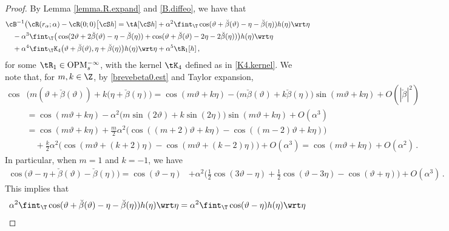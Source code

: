 \documentclass[a4paper,reqno,10pt]{article}
\newcommand{\OpM}{{\rm O}{\rm P}{\rm M}}
\begin{document}
\begin{proof}
	By Lemma \ref{lemma.R.expand} and \eqref{B.diffeo}, we have that
	\begin{align}
		&	\cB^{-1}	\big(\cR(r_\alpha;\alpha)- \cR(0;0)\big [\cS h]  = 	\tA[\cS h]+ \alpha^2\fint_{\T}\cos(\vartheta+\breve{\beta}(\vartheta)-\eta-\breve{\beta}(\eta)) h(\eta) \wrt \eta  \\
		&\quad  - \alpha^3 \fint_{\T}\big( \cos(2\vartheta+2\breve{\beta}(\vartheta)-\eta-\breve{\beta}(\eta)) + \cos(\vartheta+\breve{\beta}(\vartheta)-2\eta-2\breve{\beta}(\eta)) \big)h(\eta) \wrt \eta    \\
		& \quad+\alpha^4\fint_{\T} \mathtt{K}_4\big(\vartheta+\breve{\beta}(\vartheta), \eta+\breve{\beta}(\eta) \big)h(\eta) \wrt\eta+\alpha^5 \tR_{1}[h]\,,
	\end{align}  
	for some $\tR_{1}\in\OpM_{s}^{-\infty}$, with the kernel $\tK_{4}$ defined as in \eqref{K4.kernel}.
	We note that, for $m,k\in\Z$, by \eqref{brevebeta0.est} and Taylor expansion,
	\begin{align}
		\cos &\big(m(\vartheta+\breve{\beta}(\vartheta)) +k(\eta+\breve{\beta}(\eta) \big)   = \cos(m\vartheta+k\eta) -\big(m \breve{\beta}(\vartheta) + k\breve{\beta}(\eta)\big) \sin(m\vartheta+k\eta) + O(|\breve{\beta}|^2) \\
		\label{powerade6} & = \cos(m\vartheta+k\eta) -  \alpha^2 \big(m\sin(2\vartheta)+k\sin(2\eta)\big)\sin(m\vartheta+k\eta) + O(\alpha^3) \\
		& = \cos(m\vartheta+k\eta) + \tfrac{m}{2}\alpha^2\big( \cos((m+2)\vartheta+k\eta) - \cos((m-2)\vartheta+k\eta) \big) \\
		 &\quad + \tfrac{k}{2}\alpha^2\big( \cos(m\vartheta+(k+2)\eta) - \cos(m\vartheta+(k-2)\eta) \big) + O(\alpha^3) = \cos(m\vartheta+k\eta) + O(\alpha^2)\,.
	\end{align}
	In particular, when $m=1$ and $k=-1$, we have
	\begin{equation}
		\begin{aligned}
			\cos\big(\vartheta-\eta  + \breve{\beta}(\vartheta)-\breve{\beta}(\eta)\big)   = \cos(\vartheta-\eta) &+ \alpha^2 \big( \tfrac12 \cos(3\vartheta-\eta)  + \tfrac12 \cos(\vartheta-3\eta) - \cos(\vartheta+\eta) \big)+ O(\alpha^3 ) \,.
		\end{aligned}
	\end{equation}
	This implies that
	\begin{align*}%
		&\alpha^2 \fint_{\T}   \cos(\vartheta+\breve{\beta}(\vartheta)-\eta - \breve{\beta}(\eta))   h(\eta) \wrt \eta    = \alpha^2 \fint_{\T}   \cos(\vartheta-\eta)   h(\eta) \wrt \eta \\

\end{align*}
\end{proof}
\end{document}
